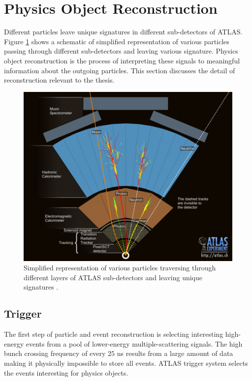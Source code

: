 \section{ Physics Object Reconstruction} 
\label{sec:ParticleReconstruction}
Different particles leave unique signatures in different sub-detectors of ATLAS. Figure \ref{fig:ATLASTransverse} shows a schematic of simplified representation of various particles passing through different sub-detectors and leaving various signature. Physics object reconstruction is the process of interpreting these signals to meaningful information about the outgoing particles. This section discusses the detail of reconstruction relevant to the thesis. 

\begin{figure}
    \centering
    \includegraphics[width=.98\linewidth]{figures/LHC/ATLAS_Transverse.jpg}
    \caption{ Simplified representation of various particles traversing through different layers of ATLAS sub-detectors and leaving unique signatures \cite{ATLASTransverse}.\label{fig:ATLASTransverse}}
\end{figure}

\subsection{Trigger}
\label{subsec:TriggerATLAS}
The first step of particle and event reconstruction is selecting interesting high-energy events from a pool of lower-energy multiple-scattering signals. The high bunch crossing frequency of every $25$ ns results from a large amount of data making it physically impossible to store all events. ATLAS trigger system selects the events interesting for physics objects. 

